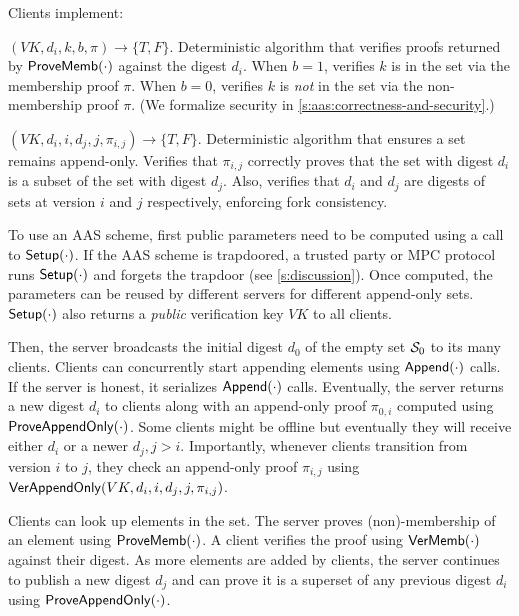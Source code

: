Clients implement:
\vspace{.5em}

\api {\vermemb}$(VK, d_i, k, b, \pi) \rightarrow \{T, F\}$.
Deterministic algorithm that verifies proofs returned by $\mathsf{ProveMemb}(\cdot)$ against the digest $d_i$.
When $b=1$, verifies $k$ is in the set via the membership proof $\pi$.
When $b=0$, verifies $k$ is \textit{not} in the set via the non-membership proof $\pi$.
(We formalize security in \cref{s:aas:correctness-and-security}.)

\api {\verappendonly}$(VK, d_i, i, d_j, j, \pi_{i,j}) \rightarrow \{T, F\}$.
Deterministic algorithm that ensures a set remains append-only.
Verifies that $\pi_{i,j}$ correctly proves that the set with digest $d_i$ is a subset of the set with digest $d_j$.
Also, verifies that $d_i$ and $d_j$ are digests of sets at version $i$ and $j$ respectively, enforcing fork consistency.

To use an AAS scheme, first public parameters need to be computed using a call to $\mathsf{Setup}(\cdot)$.
If the AAS scheme is trapdoored, a trusted party or MPC protocol runs $\mathsf{Setup}(\cdot)$ and forgets the trapdoor (see \cref{s:discussion}).
Once computed, the parameters can be reused by different servers for different append-only sets.
$\mathsf{Setup}(\cdot)$ also returns a \textit{public} verification key $VK$ to all clients.

Then, the server broadcasts the initial digest $d_0$ of the empty set $\mathcal{S}_0$ to its many clients.
Clients can concurrently start appending elements using $\mathsf{Append}(\cdot)$ calls.
If the server is honest, it serializes $\mathsf{Append}(\cdot)$ calls.
Eventually, the server returns a new digest $d_i$ to clients along with an append-only proof $\pi_{0,i}$ computed using $\mathsf{ProveAppendOnly}(\cdot)$.
Some clients might be offline but eventually they will receive either $d_i$ or a newer $d_j, j > i$.
Importantly, whenever clients transition from version $i$ to $j$, they check an append-only proof $\pi_{i,j}$ using $\mathsf{VerAppendOnly}(VK, d_i, i, d_j, j, \pi_{i,j})$.

Clients can look up elements in the set.
The server proves (non)\hyp{}membership of an element using $\mathsf{ProveMemb}(\cdot)$.
A client verifies the proof using $\mathsf{VerMemb}(\cdot)$ against their digest.
As more elements are added by clients, the server continues to publish a new digest $d_j$ and can prove it is a superset of any previous digest $d_i$ using $\mathsf{ProveAppendOnly}(\cdot)$.

